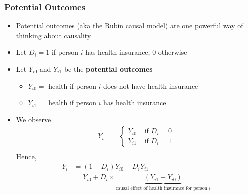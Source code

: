 \begin{frame} [allowframebreaks]\frametitle{Potential Outcomes}
  \begin{itemize}
  \item Potential outcomes (aka the Rubin causal model) are one
    powerful way of thinking about causality
  \item Let $D_i = 1$ if person $i$ has health insurance, $0$ otherwise
  \item Let $Y_{i0}$ and $Y_{i1}$ be the \textbf{potential outcomes}
    \begin{itemize}
    \item $Y_{i0} =$ health if person $i$ does not have health insurance
    \item $Y_{i1} =$ health if person $i$ has health insurance
    \end{itemize}
  \item We observe 
    \begin{align*}
      Y_i &=  \begin{cases} Y_{i0} & \text{ if } D_i = 0 \\
        Y_{i1} & \text{ if } D_i = 1 \end{cases} \\
\end{align*}
Hence,
\begin{align*}
      Y_i& = (1 - D_i) Y_{i0} +
      D_i Y_{i1} \\
      &=  Y_{i0} + D_i \times \underbrace{(Y_{i1} - Y_{i0})}_{\text{causal effect
          of health insurance for person }i}
    \end{align*}
  

\framebreak


\end{itemize}
\end{frame}
